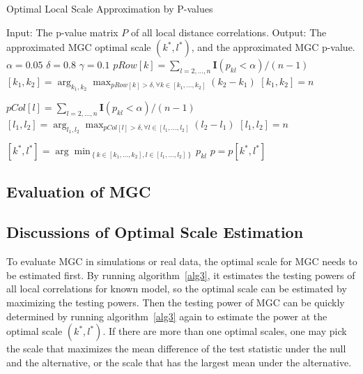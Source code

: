 \documentclass[11pt]{article}
\providecommand{\mb}[1]{\boldsymbol{#1}}
\begin{document}
\begin{algorithm}
\caption{Optimal Local Scale Approximation by P-values}
\label{alg5}
\begin{algorithmic}
\State Input: The p-value matrix $P$ of all local distance correlations. 
\State Output: The approximated MGC optimal scale $(k^{*},l^{*})$, and the approximated MGC p-value.
\State $\alpha=0.05$ 
\State $\delta=0.8$ 
\State $\gamma=0.1$ 
\State $pRow[k]=\sum_{l=2,\ldots,n}\mb{I}(p_{kl}<\alpha)/(n-1)$ 
\State $[k_{1},k_{2}]=\arg_{k_{1},k_{2}}\max_{pRow[k]>\delta, \forall k \in [k_{1},\ldots,k_{2}]}(k_{2}-k_{1})$
\State $[k_{1},k_{2}]=n$
\EndIf

\State $pCol[l]=\sum_{l=2,\ldots,n}\mb{I}(p_{kl}<\alpha)/(n-1)$ 
\State $[l_{1},l_{2}]=\arg_{l_{1},l_{2}}\max_{pCol[l]>\delta, \forall l \in [l_{1},\ldots,l_{2}]}(l_{2}-l_{1})$
\State $[l_{1},l_{2}]=n$
\EndIf

\State $[k^{*},l^{*}]=\arg\min_{\left\{k \in [k_{1},\ldots,k_{2}], l \in [l_{1},\ldots,l_{2}]\right\}} p_{kl}$ 
\State $p=p[k^{*},l^{*}]$
\EndFunction
\end{algorithmic}
\end{algorithm}

\subsection{Evaluation of MGC}
\label{appen:eval}

\subsection{Discussions of Optimal Scale Estimation}
\label{appen:diss}
To evaluate MGC in simulations or real data, the optimal scale for MGC needs to be estimated first. By running algorithm~\ref{alg3}, it estimates the testing powers of all local correlations for known model, so the optimal scale can be estimated by maximizing the testing powers. Then the testing power of MGC can be quickly determined by running algorithm~\ref{alg3} again to estimate the power at the optimal scale $(k^{*},l^{*})$. If there are more than one optimal scales, one may pick the scale that maximizes the mean difference of the test statistic under the null and the alternative, or the scale that has the largest mean under the alternative. 
\end{document}
